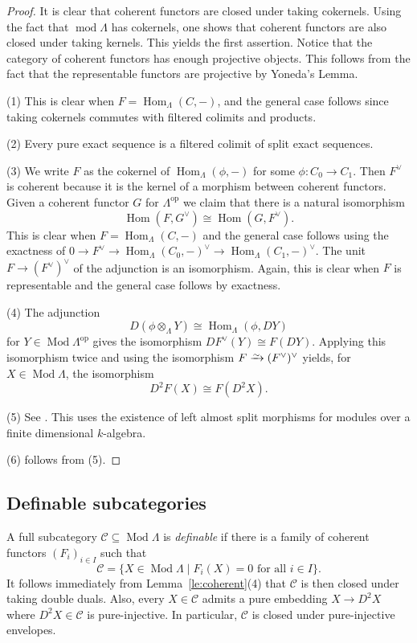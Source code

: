 \documentclass[a4paper]{amsart}
\theoremstyle{plain}
\theoremstyle{definition}
\theoremstyle{remark}
\numberwithin{equation}{section}
\newcommand{\Hom}{\operatorname{Hom}}
\renewcommand{\mod}{\operatorname{mod}}
\newcommand{\Mod}{\operatorname{Mod}}
\newcommand{\op}{\mathrm{op}}
\newcommand{\iso}{\xrightarrow{\raisebox{-.4ex}[0ex][0ex]{$\scriptstyle{\sim}$}}}
\def\C{\mathcal C}
\def\La{\Lambda}
\begin{document}
\begin{proof}
  It is clear that coherent functors are closed under taking
  cokernels. Using the fact that $\mod\Lambda$ has cokernels, one
  shows that coherent functors are also closed under taking
  kernels. This yields the first assertion. Notice that the category
  of coherent functors has enough projective objects. This follows
  from the fact that the representable functors are projective by
  Yoneda's Lemma.
  
(1) This is clear when $F=\Hom_\Lambda(C,-)$, and the general case follows since taking cokernels commutes with filtered colimits and products.

(2) Every pure exact sequence is a filtered colimit of split exact sequences.

(3) We write $F$ as the cokernel of $\Hom_\Lambda(\phi,-)$ for some
$\phi\colon C_0\to C_1$. Then $F^\vee$ is coherent because it is the
kernel of a morphism between coherent functors. Given a coherent
functor $G$ for $\La^\op$ we claim that there is a natural isomorphism
\[\Hom(F,G^\vee)\cong\Hom(G,F^\vee).\]
This is clear when $F=\Hom_\La(C,-)$ and the general case follows
using the exactness of $0\to F^\vee\to \Hom_\La(C_0,-)^\vee\to
\Hom_\La(C_1,-)^\vee$. The unit $F\to
(F^\vee)^\vee$ of the adjunction is an isomorphism. Again, this is
clear when $F$ is representable and the general case follows by exactness.

(4) The adjunction
\[ D(\phi\otimes_\Lambda Y) \cong \Hom_\Lambda(\phi,DY) \] for
$Y\in\Mod\Lambda^\op$ gives the isomorphism $DF^\vee(Y)\cong F(DY)$.
Applying this isomorphism twice and using the isomorphism
$F\iso (F^\vee)^\vee$ yields, for $X\in\Mod\Lambda$, the isomorphism
\[ D^2F(X) \cong F(D^2X). \]

(5) See \cite[II.2]{Au1978}. This uses the existence of left almost split morphisms for modules over a finite dimensional $k$-algebra.

(6) follows from (5).
\end{proof}


\subsection*{Definable subcategories}

A full subcategory $\C\subseteq\Mod\Lambda$ is \emph{definable} if there is a family of coherent functors $(F_i)_{i\in I}$ such that
\[ \C = \{ X \in \Mod\Lambda \mid F_i(X)=0 \text{ for all } i\in I\}. \]
It follows immediately from Lemma~\ref{le:coherent}(4) that $\C$ is then closed under taking double duals. Also, every $X\in\C$ admits a pure embedding $X\to D^2X$ where $D^2X\in\C$ is pure-injective. In particular, $\C$ is closed under pure-injective envelopes.
\end{document}
